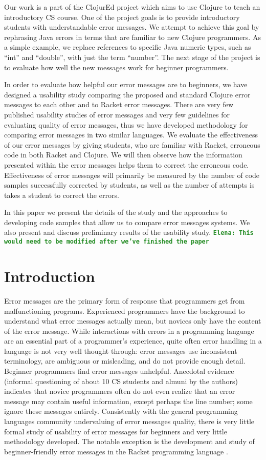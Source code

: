 \documentclass[12pt]{article}
\newcommand{\comment}[1]{{\bf \tt  {#1}}}
\newcommand{\emcomment}[1]{\textcolor{ForestGreen}{\comment{Elena: {#1}}}}
\begin{document}
Our work is a part of the ClojurEd project which aims to use Clojure to teach an introductory CS course. One of the project goals is to provide introductory students with understandable error messages. We attempt to achieve this goal by rephrasing Java errors in terms that are familiar to new Clojure programmers. As a simple example, we replace references to specific Java numeric types, such as “int” and “double”, with just the term “number”. The next stage of the project is to evaluate how well the new messages work for beginner programmers. 

In order to evaluate how helpful our error messages are to beginners, we have designed a usability study comparing the proposed and standard Clojure error messages to each other and to Racket error messages. There are very few published usability studies of error messages and very few guidelines for evaluating quality of error messages, thus we have developed methodology for comparing error messages in two similar languages. We evaluate the effectiveness of our error messages by giving students, who are familiar with Racket, erroneous code in both Racket and Clojure. We will then observe how the information presented within the error messages helps them to correct the erroneous code. Effectiveness of error messages will primarily be measured by the number of code samples successfully corrected by students, as well as the number of attempts is takes a student to correct the errors. 

In this paper we present the details of the study and the approaches to developing code samples that allow us to compare error messages systems. We also present and discuss preliminary results of the usability study. 
\emcomment{This would need to be modified after we've finished the paper}
\newpage
\setcounter{page}{1}

\section{Introduction}\label{sec:intro}
Error messages are the primary form of response that programmers get from malfunctioning programs. 
Experienced programmers have the background to understand what error messages actually mean, but novices only have the content of the error message. 
While interactions with errors in a programming language are an essential part of a programmer's experience, quite often error handling in a language is not very well thought through: error messages use inconsistent terminology, are ambiguous or misleading, and do not provide enough detail. 
Beginner programmers find error messages unhelpful.
Anecdotal evidence (informal questioning of about 10 CS students and almuni by the authors) indicates that novice programmers often do not even realize that an error message may contain useful information, except perhaps the line number; some ignore these messages entirely. 
Consistently with the general programming languages community undervaluing of error messages quality, there is very little formal study of usability of error messages for beginners and very little methodology developed. The notable exception is the development and study of beginner-friendly error messages in the Racket programming language \cite{Marceau:2011,Marceau:2011-2}. 
\end{document}
